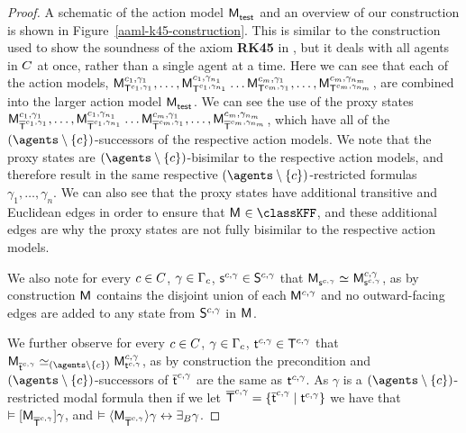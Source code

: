 \begin{proof}
A schematic of the action model $\aPModel{\aStateTest}$ and an overview of our construction is shown in Figure~\ref{aaml-k45-construction}.
This is similar to the construction used to show the soundness of the axiom {\bf RK45} in \logicRmlKFF{}, but it deals with all agents in $\agentsC$ at once, rather than a single agent at a time.
Here we can see that each of the action models, $\aPModel[\agentC_1,\gamma_1]{\aStatesT[\agentC_1, \gamma_1]}, \dots, \aPModel[\agentC_1,\gamma_{n_1}]{\aStatesT[\agentC_1, \gamma_{n_1}]} \dots \aPModel[\agentC_m,\gamma_1]{\aStatesT[\agentC_m, \gamma_1]}, \dots, \aPModel[\agentC_m,\gamma_{n_m}]{\aStatesT[\agentC_m, \gamma_{n_m}]}$, are combined into the larger action model $\aPModel{\aStateTest}$.
We can see the use of the proxy states $\aPModel[\agentC_1,\gamma_1]{\aPStatesT[\agentC_1, \gamma_1]}, \dots, \aPModel[\agentC_1,\gamma_{n_1}]{\aPStatesT[\agentC_1, \gamma_{n_1}]} \dots \aPModel[\agentC_m,\gamma_1]{\aPStatesT[\agentC_m, \gamma_1]}, \dots, \aPModel[\agentC_m,\gamma_{n_m}]{\aPStatesT[\agentC_m, \gamma_{n_m}]}$, which have all of the $(\agents \setminus \{\agentC\})$-successors of the respective action models.
We note that the proxy states are $(\agents \setminus \{\agentC\})$-bisimilar to the respective action models, and therefore result in the same respective $(\agents \setminus \{\agentC\})$-restricted formulas $\gamma_1, \dots, \gamma_n$.
We can also see that the proxy states have additional transitive and Euclidean edges in order to ensure that $\aModel \in \classKFF$, and these additional edges are why the proxy states are not fully bisimilar to the respective action models.

We also note for every $\agentC \in \agentsC$, $\gamma \in \Gamma_\agentC$, $\aStateS[\agentC, \gamma] \in \aStates[\agentC, \gamma]$ that $\aPModel{\aStateS[\agentC, \gamma]} \bisimilar \aPModel[\agentC, \gamma]{\aStateS[\agentC, \gamma]}$, as by construction $\aModel$ contains the disjoint union of each $\aModel[\agentC, \gamma]$ and no outward-facing edges are added to any state from $\aStates[\agentC, \gamma]$ in $\aModel$.

We further observe for every $\agentC \in \agentsC$, $\gamma \in \Gamma_\agentC$, $\aStateT[\agentC, \gamma] \in \aStatesT[\agentC, \gamma]$ that $\aPModel{\aPStateT[\agentC, \gamma]} \bisimilar[(\agents \setminus \{\agentC\})] \aPModel[\agentC, \gamma]{\aStateT[\agentC, \gamma]}$, as by construction the precondition and $(\agents \setminus \{\agentC\})$-successors of $\aPStateT[\agentC, \gamma]$ are the same as $\aStateT[\agentC, \gamma]$.
As $\gamma$ is a $(\agents \setminus \{\agentC\})$-restricted modal formula then if we let $\aPStatesT[\agentC, \gamma] = \{\aPStateT[\agentC, \gamma] \mid \aStateT[\agentC, \gamma]\}$ we have that
$\entails \actionA{\aPModel{\aPStatesT[\agentC, \gamma]}} \gamma$, and
$\entails \actionE{\aPModel{\aPStatesT[\agentC, \gamma]}} \gamma \iff \someactsBs \gamma$.


\end{proof}
